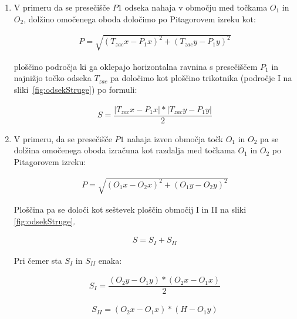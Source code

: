 \begin{enumerate}
	\item V primeru da se presečišče $P1$ odseka nahaja v območju med točkama $O_1$ in $O_2$, dolžino omočenega oboda določimo po Pitagorovem izreku kot:
	
	
	\begin{ceqn}
		\begin{align}
		P = \sqrt{(T_{zac}x - P_1x)^{2} + (T_{zac}y - P_1y)^{2}}
		\end{align}
	\end{ceqn}
	
	
	ploščino področja ki ga oklepajo horizontalna ravnina s presečiščem $P_1$ in najnižjo točko odseka $T_{zac}$ pa določimo kot ploščino trikotnika (področje I na sliki~\ref{fig:odsekStruge}) po formuli:
	
	\begin{ceqn}
	\begin{align}
	S = \dfrac{|T_{zac}x - P_1x| * |T_{zac}y - P_1y|}{2}
	\end{align}
	\end{ceqn}
	
	
	\item V primeru, da se presečišče $P1$ nahaja izven območja točk $O_1$ in $O_2$ pa se dolžina omočenega oboda izračuna kot razdalja med točkama $O_1$ in $O_2$ po Pitagorovem izreku:
	
	\begin{ceqn}
	\begin{align}
	P = \sqrt{ (O_1x - O_2x)^{2} + (O_1y - O_2y)^{2}}
	\end{align}
	\end{ceqn}
	
	Ploščina pa se določi kot seštevek ploščin območij I in II na sliki \ref{fig:odsekStruge}.
	
	\begin{ceqn}
	\begin{align}
	S = S_I + S_{II}
	\end{align}
	\end{ceqn}
	
	Pri čemer sta $S_I$ in $S_{II}$ enaka:
	

	\begin{ceqn}
	\begin{align}
	S_I =\dfrac{ (O_2y - O_1y) *  (O_2x - O_1x)}{2}
	\end{align}
	
	\begin{align}
	S_{II} = (O_2x - O_1x) * (H - O_1y)
	\end{align}
	\end{ceqn}

	
	
	
	
\end{enumerate}


